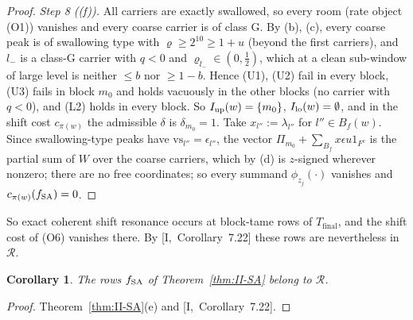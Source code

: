 \documentclass[10pt]{amsart}
\newtheorem{corollary}[theorem]{Corollary}
\theoremstyle{definition}
\theoremstyle{remark}
\newcommand{\Rec}{\mathcal R}
\begin{document}
\begin{proof}
\emph{Step 8 ((f)).}  All carriers are exactly swallowed, so every room
(rate object (O1)) vanishes and every coarse carrier is of class G.  By (b),
(c), every coarse peak is of swallowing type with $\varrho\ge2^{10}\ge1+u$
(beyond the first carriers), and $l_-$ is a class-G carrier with $q<0$ and
$\varrho_{l_-}\in(0,\frac12)$, which at a clean sub-window of large level is
neither $\le b$ nor $\ge1-b$.  Hence (U1), (U2) fail in every block, (U3)
fails in block $m_0$ and holds vacuously in the other blocks (no carrier
with $q<0$), and (L2) holds in every block.  So $I_{\rm up}(w)=\{m_0\}$,
$I_{\rm lo}(w)=\emptyset$, and in the shift cost $c_{\pi(w)}$ the admissible
$\delta$ is $\delta_{m_0}=1$.  Take $x_{l''}:=\lambda_{l''}$ for $l''\in
B_f(w)$.  Since swallowing-type peaks have $\mathrm{vs}_{l''}=\epsilon_{l''}$,
the vector $\Pi_{m_0}+\sum_{B_f}x\epsilon u1_{F^c}$ is the partial sum of
$W$ over the coarse carriers, which by (d) is $z$-signed wherever nonzero;
there are no free coordinates; so every summand $\phi_{z_j}(\cdot)$ vanishes
and $c_{\pi(w)}(f_{\rm SA})=0$.
\end{proof}

So exact coherent shift resonance occurs at block-tame rows of
$T_{\mathrm{final}}$, and the shift cost of (O6) vanishes there.  By
[I,~Corollary~7.22] these rows are nevertheless in $\Rec$.

\begin{corollary}\label{cor:II-SArec}
The rows $f_{\rm SA}$ of Theorem~\textup{\ref{thm:II-SA}} belong to $\Rec$.
\end{corollary}

\begin{proof}
Theorem~\ref{thm:II-SA}(e) and [I,~Corollary~7.22].
\end{proof}
\end{document}
